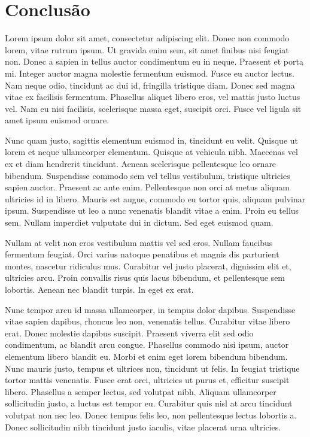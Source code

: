 \section{Conclusão}
Lorem ipsum dolor sit amet, consectetur adipiscing elit. Donec non commodo lorem, vitae rutrum ipsum. Ut gravida enim sem, sit amet finibus nisi feugiat non. Donec a sapien in tellus auctor condimentum eu in neque. Praesent et porta mi. Integer auctor magna molestie fermentum euismod. Fusce eu auctor lectus. Nam neque odio, tincidunt ac dui id, fringilla tristique diam. Donec sed magna vitae ex facilisis fermentum. Phasellus aliquet libero eros, vel mattis justo luctus vel. Nam eu nisi facilisis, scelerisque massa eget, suscipit orci. Fusce vel ligula sit amet ipsum euismod ornare.

Nunc quam justo, sagittis elementum euismod in, tincidunt eu velit. Quisque ut lorem et neque ullamcorper elementum. Quisque at vehicula nibh. Maecenas vel ex et diam hendrerit tincidunt. Aenean scelerisque pellentesque leo ornare bibendum. Suspendisse commodo sem vel tellus vestibulum, tristique ultricies sapien auctor. Praesent ac ante enim. Pellentesque non orci at metus aliquam ultricies id in libero. Mauris est augue, commodo eu tortor quis, aliquam pulvinar ipsum. Suspendisse ut leo a nunc venenatis blandit vitae a enim. Proin eu tellus sem. Nullam imperdiet vulputate dui in dictum. Sed eget euismod quam.

Nullam at velit non eros vestibulum mattis vel sed eros. Nullam faucibus fermentum feugiat. Orci varius natoque penatibus et magnis dis parturient montes, nascetur ridiculus mus. Curabitur vel justo placerat, dignissim elit et, ultricies arcu. Proin convallis risus quis lacus bibendum, et pellentesque sem lobortis. Aenean nec blandit turpis. In eget ex erat.

Nunc tempor arcu id massa ullamcorper, in tempus dolor dapibus. Suspendisse vitae sapien dapibus, rhoncus leo non, venenatis tellus. Curabitur vitae libero erat. Donec molestie dapibus suscipit. Praesent viverra elit sed odio condimentum, ac blandit arcu congue. Phasellus commodo nisi ipsum, auctor elementum libero blandit eu. Morbi et enim eget lorem bibendum bibendum. Nunc mauris justo, tempus et ultrices non, tincidunt ut felis. In feugiat tristique tortor mattis venenatis. Fusce erat orci, ultricies ut purus et, efficitur suscipit libero. Phasellus a semper lectus, sed volutpat nibh. Aliquam ullamcorper sollicitudin justo, a luctus est tempor eu. Curabitur quis nisl at arcu tincidunt volutpat non nec leo. Donec tempus felis leo, non pellentesque lectus lobortis a. Donec sollicitudin nibh tincidunt justo iaculis, vitae placerat urna ultricies.

